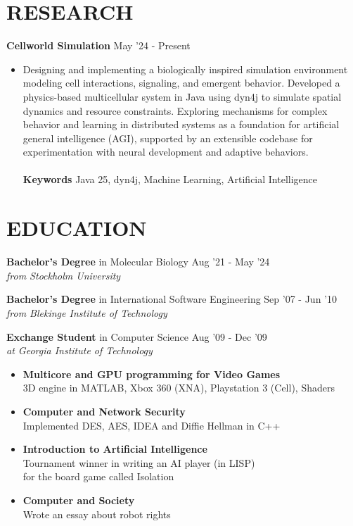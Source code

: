 \documentclass[overlapped]{res}
\begin{document}
 
\begin{resume}
\vspace{1.2cm}
\section{{\sc RESEARCH}} 

{\bf Cellworld Simulation} \hfill May '24 - Present\\
\begin{itemize}
\itemsep -1pt
\item Designing and implementing a biologically inspired simulation environment modeling cell interactions, signaling, and emergent behavior. Developed a physics-based multicellular system in Java using dyn4j to simulate spatial dynamics and resource constraints. Exploring mechanisms for complex behavior and learning in distributed systems as a foundation for artificial general intelligence (AGI), supported by an extensible codebase for experimentation with neural development and adaptive behaviors.\\
\\{\bf Keywords} Java 25, dyn4j, Machine Learning, Artificial Intelligence
\end{itemize}

\section{{\sc EDUCATION}}

{\bf Bachelor's Degree} in Molecular Biology \hfill Aug '21 - May '24\\
{\sl from Stockholm University}

{\bf Bachelor's Degree} in International Software Engineering \hfill Sep '07 - Jun '10\\
{\sl from Blekinge Institute of Technology}

{\bf Exchange Student} in Computer Science \hfill Aug '09 - Dec '09\\
{\sl at Georgia Institute of Technology}
\begin{itemize}
\itemsep -1pt
\item {\bf Multicore and GPU programming for Video Games}\\ 3D engine in MATLAB, Xbox 360 (XNA), Playstation 3 (Cell), Shaders 
\item {\bf Computer and Network Security}\\ Implemented DES, AES, IDEA and Diffie Hellman in C++
\item {\bf Introduction to Artificial Intelligence}\\ Tournament winner in writing an AI player (in LISP) \\for the board game called Isolation
\item {\bf Computer and Society} \\ Wrote an essay about robot rights
\end{itemize}


\end{resume}
\end{document}
